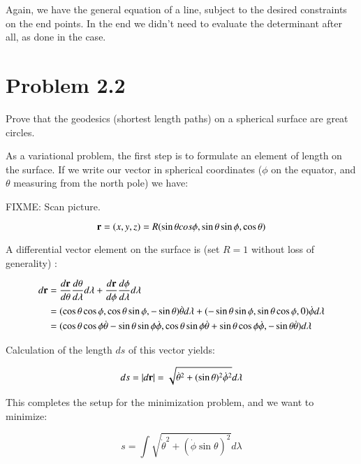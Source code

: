 \documentclass{article}      %
\newcommand{\Abs}[1]{\left\lvert{#1}\right\rvert}
\newcommand{\dottheta}[0]{\dot{\theta}}
\newcommand{\dotphi}[0]{\dot{\phi}}
\begin{document}
Again, we have the general equation of a line, subject to the desired constraints on the end points.  In the end we didn't need to 
evaluate the determinant after all, as done in the 
 case.

\section{ Problem 2.2 }

Prove that the geodesics (shortest length paths) on a spherical surface are great circles.

As a variational problem, the first step is to formulate an element of length on the surface.  If we write our vector in spherical coordinates ($\phi$ on the equator, and $\theta$ measuring from the north pole) we have:

FIXME: Scan picture.

\begin{equation*}
\mathbf{r} = (x, y, z) = R( \sin\theta cos\phi, \sin\theta \sin\phi, \cos\theta)
\end{equation*}

A differential vector element on the surface is (set $R=1$ without loss of generality) :

\begin{align*}
d \Br 
&= \frac{d\Br}{d \theta} \frac{d \theta}{d \lambda} d \lambda + \frac{d\Br}{d \phi} \frac{d \phi}{d \lambda} d \lambda \\
&=
 ( \cos\theta \cos\phi, \cos\theta \sin\phi, -\sin\theta) \dottheta d\lambda
+( -\sin\theta \sin\phi, \sin\theta \cos\phi, 0) \dotphi d\lambda \\
&=
 ( \cos\theta \cos\phi \dottheta - \sin\theta \sin\phi \dotphi,
   \cos\theta \sin\phi \dottheta + \sin\theta \cos\phi \dotphi,
  -\sin\theta \dottheta) d\lambda
\end{align*}

Calculation of the length $ds$ of this vector yields:

\begin{equation*}
ds = \Abs{ d\Br} = \sqrt{\dottheta^2 + (\sin\theta)^2 \dotphi^2} d\lambda
\end{equation*}

This completes the setup for the minimization problem, and we want to 
minimize:

\begin{equation*}
s = \int \sqrt{\dottheta^2 + ( \dotphi \sin\theta )^2 } d\lambda
\end{equation*}
\end{document}
